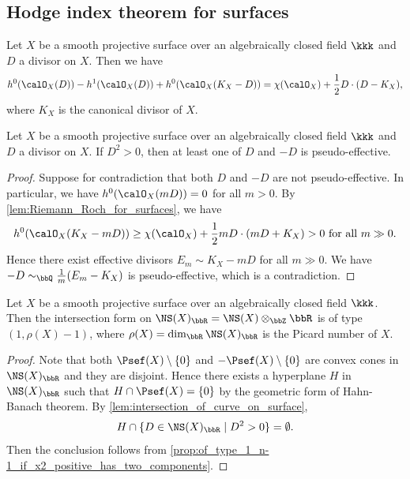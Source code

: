 \subsection{Hodge index theorem for surfaces}

    \begin{lemma}\label{lem:Riemann_Roch_for_surfaces}
        Let \(X\) be a smooth projective surface over an algebraically closed field \(\kkk\) and \(D\) a divisor on \(X\).
        Then we have
        \[ h^0(\calO_X(D)) - h^1(\calO_X(D)) + h^0(\calO_X(K_X-D)) = \chi(\calO_X) + \frac{1}{2}D \cdot (D - K_X), \]
        where \(K_X\) is the canonical divisor of \(X\).
    \end{lemma}

    \begin{lemma}\label{lem:intersection_of_curve_on_surface}
        Let \(X\) be a smooth projective surface over an algebraically closed field \(\kkk\) and \(D\) a divisor on \(X\).
        If \(D^2 > 0\), then at least one of \(D\) and \(-D\) is pseudo-effective.
    \end{lemma}
    \begin{proof}
        Suppose for contradiction that both \(D\) and \(-D\) are not pseudo-effective.
        In particular, we have \(h^0(\calO_X(mD)) = 0\) for all \(m > 0\).
        By \cref{lem:Riemann_Roch_for_surfaces}, we have
        \[ h^0(\calO_X(K_X - mD)) \geq \chi(\calO_X) + \frac{1}{2}mD \cdot (mD + K_X) > 0 \text{ for all } m \gg 0. \]
        Hence there exist effective divisors \(E_m \sim K_X - mD\) for all \(m \gg 0\).
        We have \(-D \sim_\bbQ \frac{1}{m}(E_m - K_X)\) is pseudo-effective, which is a contradiction.
    \end{proof}

    \begin{theorem}\label{thm:Hodge_index_theorem_for_surfaces}
        Let \(X\) be a smooth projective surface over an algebraically closed field \(\kkk\).
        Then the intersection form on \(\NS(X)_\bbR = \NS(X) \otimes_\bbZ \bbR\) is of type \((1, \rho(X)-1)\), where \(\rho(X) = \dim_\bbR \NS(X)_\bbR\) is the Picard number of \(X\).
    \end{theorem}
    \begin{proof}
        Note that both \(\Psef(X) \setminus \{0\}\) and \(-\Psef(X) \setminus \{0\}\) are convex cones in \(\NS(X)_\bbR\) and they are disjoint.
        Hence there exists a hyperplane \(H\) in \(\NS(X)_\bbR\) such that \(H \cap \Psef(X) = \{0\}\) by the geometric form of Hahn-Banach theorem.
        By \cref{lem:intersection_of_curve_on_surface}, 
        \[ H \cap \{D \in \NS(X)_\bbR \mid D^2 > 0\} = \emptyset. \]
        Then the conclusion follows from \cref{prop:of_type_1_n-1_if_x2_positive_has_two_components}.
    \end{proof}

